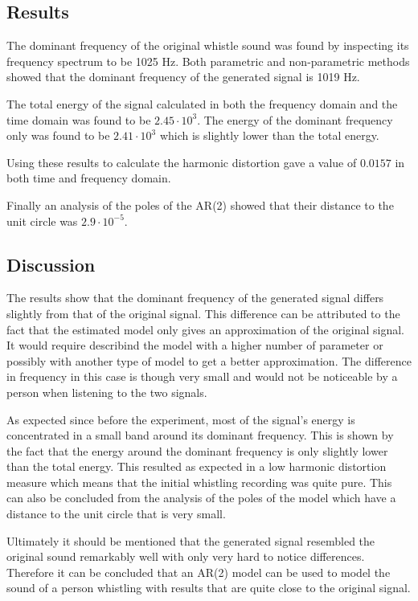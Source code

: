 \documentclass{IEEEtran}
\begin{document}
\subsection{Results}
The dominant frequency of the original whistle sound was found by inspecting
its frequency spectrum to be 1025 Hz. Both parametric and non-parametric
methods showed that the dominant frequency of the generated signal is 1019 Hz.

The total energy of the signal calculated in both the frequency domain and
the time domain was found to be $2.45\cdot10^3$. The energy of the dominant
frequency only was found to be $2.41\cdot10^3$ which is slightly lower
than the total energy.

Using these results to calculate the harmonic distortion gave a value
of $0.0157$ in both time and frequency domain.

Finally an analysis of the poles of the AR(2) showed that their distance
to the unit circle was $2.9\cdot10^{-5}$.

\subsection{Discussion}
The results show that the dominant frequency of the generated signal
differs slightly from that of the original signal. This difference can
be attributed to the fact that the estimated model only gives an
approximation of the original signal. It would require describind the
model with a higher number of parameter or possibly with another type
of model to get a better approximation. The difference in frequency
in this case is though very small and would not be noticeable
by a person when listening to the two signals.

As expected since before the experiment, most of the signal's energy
is concentrated in a small band around its dominant frequency. This
is shown by the fact that the energy around the dominant frequency is
only slightly lower than the total energy. This resulted as expected
in a low harmonic distortion measure which means that the initial
whistling recording was quite pure. This can also be concluded from
the analysis of the poles of the model which have a distance to the
unit circle that is very small.

Ultimately it should be mentioned that the generated signal resembled the
original sound remarkably well with only very hard to notice
differences. Therefore it can be concluded that an AR(2) model can
be used to model the sound of a person whistling with results that
are quite close to the original signal.
\end{document}
